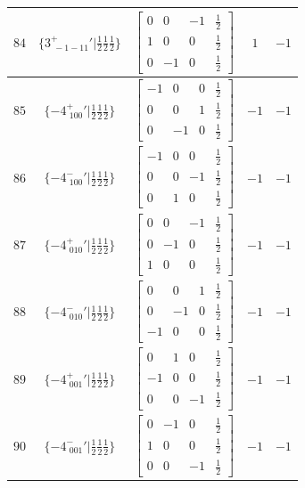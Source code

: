 \documentclass[fleqn,8pt]{jsarticle}
\begin{document}
\begin{longtable}{ccccc}
$ 84 $ & $ \{3^{+}_{\,\,-1-11}{}'|\frac{1}{2} \frac{1}{2} \frac{1}{2}\} $ & $ \begin{bmatrix} 0 & 0 & -1 & \frac{1}{2} \\ 1 & 0 & 0 & \frac{1}{2} \\ 0 & -1 & 0 & \frac{1}{2} \end{bmatrix} $ & $ 1 $ & $ -1 $ \\ \hline
$ 85 $ & $ \{-4^{+}_{\,\,100}{}'|\frac{1}{2} \frac{1}{2} \frac{1}{2}\} $ & $ \begin{bmatrix} -1 & 0 & 0 & \frac{1}{2} \\ 0 & 0 & 1 & \frac{1}{2} \\ 0 & -1 & 0 & \frac{1}{2} \end{bmatrix} $ & $ -1 $ & $ -1 $ \\ \hline
$ 86 $ & $ \{-4^{-}_{\,\,100}{}'|\frac{1}{2} \frac{1}{2} \frac{1}{2}\} $ & $ \begin{bmatrix} -1 & 0 & 0 & \frac{1}{2} \\ 0 & 0 & -1 & \frac{1}{2} \\ 0 & 1 & 0 & \frac{1}{2} \end{bmatrix} $ & $ -1 $ & $ -1 $ \\ \hline
$ 87 $ & $ \{-4^{+}_{\,\,010}{}'|\frac{1}{2} \frac{1}{2} \frac{1}{2}\} $ & $ \begin{bmatrix} 0 & 0 & -1 & \frac{1}{2} \\ 0 & -1 & 0 & \frac{1}{2} \\ 1 & 0 & 0 & \frac{1}{2} \end{bmatrix} $ & $ -1 $ & $ -1 $ \\ \hline
$ 88 $ & $ \{-4^{-}_{\,\,010}{}'|\frac{1}{2} \frac{1}{2} \frac{1}{2}\} $ & $ \begin{bmatrix} 0 & 0 & 1 & \frac{1}{2} \\ 0 & -1 & 0 & \frac{1}{2} \\ -1 & 0 & 0 & \frac{1}{2} \end{bmatrix} $ & $ -1 $ & $ -1 $ \\ \hline
$ 89 $ & $ \{-4^{+}_{\,\,001}{}'|\frac{1}{2} \frac{1}{2} \frac{1}{2}\} $ & $ \begin{bmatrix} 0 & 1 & 0 & \frac{1}{2} \\ -1 & 0 & 0 & \frac{1}{2} \\ 0 & 0 & -1 & \frac{1}{2} \end{bmatrix} $ & $ -1 $ & $ -1 $ \\ \hline
$ 90 $ & $ \{-4^{-}_{\,\,001}{}'|\frac{1}{2} \frac{1}{2} \frac{1}{2}\} $ & $ \begin{bmatrix} 0 & -1 & 0 & \frac{1}{2} \\ 1 & 0 & 0 & \frac{1}{2} \\ 0 & 0 & -1 & \frac{1}{2} \end{bmatrix} $ & $ -1 $ & $ -1 $ \\ \hline

\end{longtable}
\end{document}
